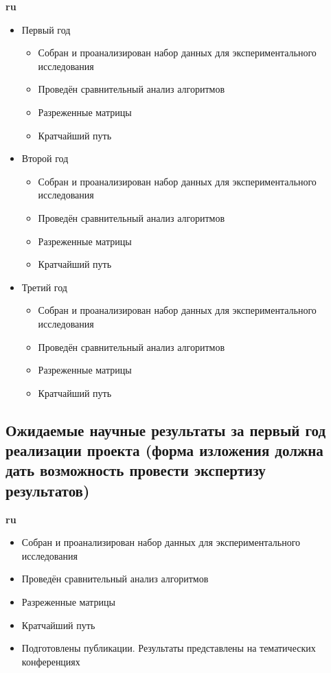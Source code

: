 \documentclass[12pt]{article}  %
\theoremstyle{remark}
\begin{document}
\textbf{ru}\\
\begin{itemize}
  \item Первый год
  \begin{itemize}
    \item Собран и проанализирован набор данных для экспериментального исследования
    \item Проведён сравнительный анализ алгоритмов
    \item Разреженные матрицы
    \item Кратчайший путь
  \end{itemize}

  \item Второй год
  \begin{itemize}
    \item Собран и проанализирован набор данных для экспериментального исследования
    \item Проведён сравнительный анализ алгоритмов
    \item Разреженные матрицы
    \item Кратчайший путь
  \end{itemize}
  \item Третий год
  \begin{itemize}
    \item Собран и проанализирован набор данных для экспериментального исследования
    \item Проведён сравнительный анализ алгоритмов
    \item Разреженные матрицы
    \item Кратчайший путь
  \end{itemize}

\end{itemize}


\subsection{Ожидаемые научные результаты за первый год реализации проекта (форма изложения должна дать возможность провести экспертизу результатов)}

\textbf{ru}\\
\begin{itemize}
  \item Собран и проанализирован набор данных для экспериментального исследования
  \item Проведён сравнительный анализ алгоритмов
  \item Разреженные матрицы
  \item Кратчайший путь
  \item Подготовлены публикации. Результаты представлены на тематических конференциях
\end{itemize}
\end{document}
